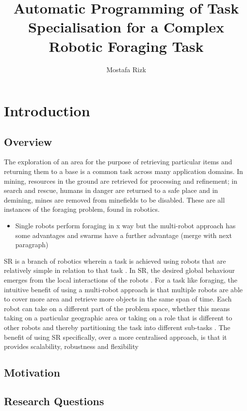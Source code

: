 \documentclass[11pt]{report}
\title{Automatic Programming of Task Specialisation for a Complex Robotic Foraging Task}
\author{Mostafa Rizk}
\begin{document}
\maketitle
\tableofcontents

\chapter{Introduction}
\section{Overview}
The exploration of an area for the purpose of retrieving particular items and returning them to a base is a common task across many application domains. In mining, resources in the ground are retrieved for processing and refinement; in search and rescue, humans in danger are returned to a safe place and in demining, mines are removed from minefields to be disabled. These are all instances of the foraging problem, found in robotics.

\begin{itemize}
	\item Single robots perform foraging in x way but the multi-robot approach has some advantages and swarms have a further advantage (merge with next paragraph) 
\end{itemize}

SR is a branch of robotics wherein a task is achieved using robots that are relatively simple in relation to that task \cite{csahin:IWSS:2004, francesca:Frontiers:2016}. In SR, the desired global behaviour emerges from the local interactions of the robots \cite{csahin:IWSS:2004, brambilla:SI:2013}. For a task like foraging, the intuitive benefit of using a multi-robot approach is that multiple robots are able to cover more area and retrieve more objects in the same span of time. Each robot can take on a different part of the problem space, whether this means taking on a particular geographic area or taking on a role that is different to other robots and thereby partitioning the task into different sub-tasks \cite{ferrante:PLOS_CB:2015}. The benefit of using SR specifically, over a more centralised approach, is that it provides scalability, robustness and flexibility


\section{Motivation}
\section{Research Questions}
\end{document}
